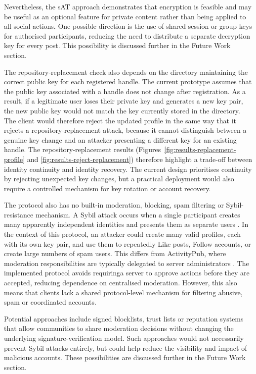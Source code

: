 Nevertheless, the sAT approach demonstrates that encryption is feasible and may be useful 
as an optional feature for private content rather than being applied to all social actions.
One possible direction is the use of shared session or group keys for authorised participants,
reducing the need to distribute a separate decryption key for every post. 
This possibility is discussed further in the Future Work section.

The repository-replacement check also depends on the directory maintaining the correct public key
for each registered handle. The current prototype assumes that the public key associated with
a handle does not change after registration. As a result, if a legitimate user loses their private
key and generates a new key pair, the new public key would not match the key currently stored in 
the directory. The client would therefore reject the updated profile in the same way that it 
rejects a repository-replacement attack, because it cannot distinguish between a genuine key change
and an attacker presenting a different key for an existing handle. The repository-replacement results
(Figures~\ref{fig:results-replacement-profile} and
\ref{fig:results-reject-replacement}) therefore highlight a trade-off between identity continuity
and identity recovery. The current
design prioritises continuity by rejecting unexpected key changes, but a practical deployment 
would also require a controlled mechanism for key rotation or account recovery.

The protocol also has no built-in moderation, blocking, spam filtering or Sybil-resistance
mechanism. A Sybil attack occurs when a single participant creates many apparently independent
identities and presents them as separate users \cite{douceur2002sybil}. 
In the context of this protocol, an attacker could create many valid profiles, each with 
its own key pair, and use them to repeatedly Like posts, Follow accounts, or create large 
numbers of spam users. This differs from ActivityPub, where moderation responsibilities
are typically delegated to server administrators \cite{w3cActivityPub2018}. 
The implemented protocol avoids requiringa server to approve actions before they are accepted,
reducing dependence on centralised moderation. However, this also means that clients 
lack a shared protocol-level mechanism for filtering abusive, spam or coordinated accounts. 

Potential approaches include signed blocklists, trust lists or reputation systems that 
allow communities to share moderation decisions without changing the underlying 
signature-verification model. Such approaches would not necessarily prevent Sybil
attacks entirely, but could help reduce the visibility and impact of malicious accounts. 
These possibilities are discussed further in the Future Work section.

